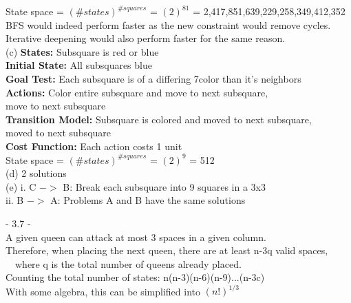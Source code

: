 \documentclass[12pt]{article}
\begin{document}
\indent\indent State space = $(\#states)^{\#squares}$ = $(2)^{81}$ = 2,417,851,639,229,258,349,412,352\\
	
\indent\indent BFS would indeed perform faster as the new constraint would remove cycles.\\
\indent\indent Iterative deepening would also perform faster for the same reason.\\
	
(c) \textbf{States:}				Subsquare is red or blue\\
\indent\indent \textbf{Initial State:}		All subsquares blue\\
\indent\indent \textbf{Goal Test:	}		Each subsquare is of a differing 7color than it's neighbors\\
\indent\indent \textbf{Actions:}			Color entire subsquare and move to next subsquare, \\
\indent\indent move to next subsquare\\
\indent\indent \textbf{Transition Model:}	Subsquare is colored and moved to next subsquare, \\
\indent\indent moved to next subsquare\\
\indent\indent \textbf{Cost Function:}		Each action costs 1 unit\\
	
\indent\indent State space = $(\#states)^{\#squares}$ = $(2)^{9}$ = 512\\

(d) 2 solutions\\

(e) i.  C $->$ B: Break each subsquare into 9 squares in a 3x3\\
\indent\indent ii. B $->$ A: Problems A and B have the same solutions\\





\noindent \hrulefill \pagebreak




- 3.7 -\\

A given queen can attack at most 3 spaces in a given column.\\
\indent Therefore, when placing the next queen, there are at least n-3q valid spaces,\\
\indent\ \  where q is the total number of queens already placed.\\
\indent Counting the total number of states: n(n-3)(n-6)(n-9)...(n-3c)\\
\indent With some algebra, this can be simplified into $(n!)^{1/3}$\\
\end{document}

